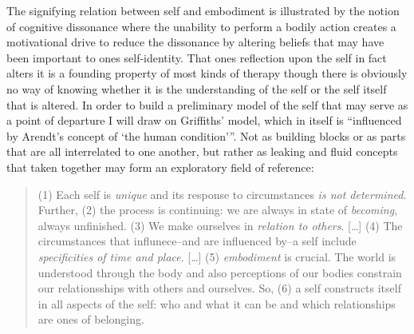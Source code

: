 \documentclass[a4paper]{article}
\begin{document}
The signifying relation between self and  embodiment is illustrated by the notion of cognitive dissonance where the unability to perform a bodily action creates a motivational drive to reduce the dissonance by altering beliefs that may have been important to ones self-identity. That ones reflection upon the self in fact alters it is a founding property of most kinds of therapy though there is obviously no way of knowing whether it is the understanding of the self or the self itself that is altered. In order to build a preliminary model of the self that may serve as a point of departure I will draw on Griffiths' model, which in itself is ``influenced by Arendt's concept of `the human condition'''. Not as building blocks or as parts that are all interrelated to one another, but rather as leaking and fluid concepts that taken together may form an exploratory field of reference:

\begin{quote}
  (1) Each self is \emph{unique} and its response to circumstances \emph{is not determined}. Further, (2) the process is continuing: we are always in  state of \emph{becoming}, always unfinished. (3) We make ourselves in \emph{relation to others}. [\ldots] (4) The circumstances that influnece--and are influenced by--a self include \emph{specificities of time and place}. [\ldots] (5) \emph{embodiment} is crucial. The world is understood through the body and also perceptions of our bodies constrain our relationsships with others and ourselves. So, (6) a self constructs itself in all aspects of the self: who and what it can be and which relationships are ones of belonging.
\end{quote}
\end{document}
